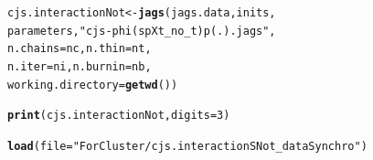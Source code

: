 \documentclass[a4paper, 10pt]{scrartcl}\usepackage[]{graphicx}\usepackage[]{color}
\makeatletter
\newcommand{\hlnum}[1]{\textcolor[rgb]{0.686,0.059,0.569}{#1}}%
\newcommand{\hlstr}[1]{\textcolor[rgb]{0.192,0.494,0.8}{#1}}%
\newcommand{\hlstd}[1]{\textcolor[rgb]{0.345,0.345,0.345}{#1}}%
\newcommand{\hlkwb}[1]{\textcolor[rgb]{0.69,0.353,0.396}{#1}}%
\newcommand{\hlkwc}[1]{\textcolor[rgb]{0.333,0.667,0.333}{#1}}%
\newcommand{\hlkwd}[1]{\textcolor[rgb]{0.737,0.353,0.396}{\textbf{#1}}}%
\newenvironment{kframe}{%
 \def\at@end@of@kframe{}%
 \ifinner\ifhmode%
  \def\at@end@of@kframe{\end{minipage}}%
  \begin{minipage}{\columnwidth}%
 \fi\fi%
 \def\FrameCommand##1{\hskip\@totalleftmargin \hskip-\fboxsep
 \colorbox{shadecolor}{##1}\hskip-\fboxsep
     \hskip-\linewidth \hskip-\@totalleftmargin \hskip\columnwidth}%
 \MakeFramed {\advance\hsize-\width
   \@totalleftmargin\z@ \linewidth\hsize
   \@setminipage}}%
 {\par\unskip\endMakeFramed%
 \at@end@of@kframe}
\newenvironment{knitrout}{}{} %
\makeatother
\begin{document}
\begin{knitrout}
\begin{kframe}
\begin{alltt}
\hlstd{cjs.interactionNot} \hlkwb{<-} \hlkwd{jags}\hlstd{(jags.data, inits,}
                           \hlstd{parameters,} \hlstr{"cjs-phi(spXt_no_t)p(.).jags"}\hlstd{,}
                        \hlkwc{n.chains} \hlstd{= nc,} \hlkwc{n.thin} \hlstd{= nt,}
                        \hlkwc{n.iter} \hlstd{= ni,} \hlkwc{n.burnin} \hlstd{= nb,}
                        \hlkwc{working.directory} \hlstd{=} \hlkwd{getwd}\hlstd{())}

\hlkwd{print}\hlstd{(cjs.interactionNot,} \hlkwc{digits} \hlstd{=} \hlnum{3}\hlstd{)}
\end{alltt}
\end{kframe}
\end{knitrout}

\begin{knitrout}
\color{fgcolor}\begin{kframe}
\begin{alltt}
\hlkwd{load}\hlstd{(}\hlkwc{file} \hlstd{=} \hlstr{"ForCluster/cjs.interactionSNot_dataSynchro"}\hlstd{)}
\end{alltt}
\end{kframe}
\end{knitrout}
\end{document}
